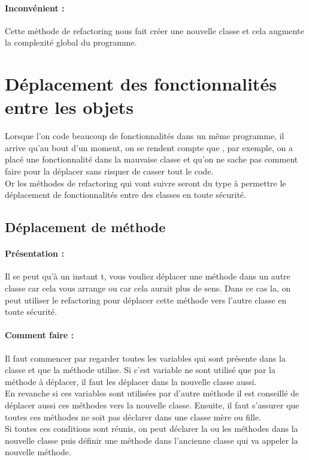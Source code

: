 \documentclass[a4paper,twoside,12pt,openright]{report}
\begin{document}
\paragraph{Inconvénient :}
Cette méthode de refactoring nous fait créer une nouvelle classe et cela augmente la complexité global du programme.\\

\newpage

\section{Déplacement des fonctionnalités entre les objets}
Lorsque l'on code beaucoup de fonctionnalités dans un même programme, il arrive qu'au bout d'un moment, on se rendent compte que , par exemple, on a placé une fonctionnalité dans la mauvaise classe et qu'on ne sache pas comment faire pour la déplacer sans risquer de casser tout le code.\\
Or les méthodes de refactoring qui vont suivre seront du type à permettre le déplacement de fonctionnalités entre des classes en toute sécurité.\\


\subsection{Déplacement de méthode}
\paragraph{Présentation :}
Il se peut qu'à un instant t, vous vouliez déplacer une méthode dans un autre classe car cela vous arrange ou car cela aurait plus de sens. Dans ce cas la, on peut utiliser le refactoring pour déplacer cette méthode vers l'autre classe en toute sécurité.

\paragraph{Comment faire :}
Il faut commencer par regarder toutes les variables qui sont présente dans la classe et que la méthode utilise. Si c'est variable ne sont utilisé que par la méthode à déplacer, il faut les déplacer dans la nouvelle classe aussi.\\
En revanche si ces variables sont utilisées par d'autre méthode il est conseillé de déplacer aussi ces méthodes vers la nouvelle classe.
Ensuite, il faut s'assurer que toutes ces méthodes ne soit pas déclarer dans une classe mère ou fille.\\
Si toutes ces conditions sont réunis, on peut déclarer la ou les méthodes dans la nouvelle classe puis définir une méthode dans l'ancienne classe qui va appeler la nouvelle méthode.
\end{document}

